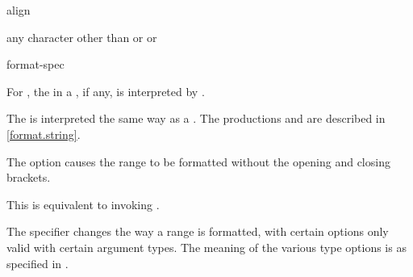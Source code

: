 \documentclass{wg21}
\begin{document}
\begin{ncbnf}
    \br
     align
\end{ncbnf}

\begin{ncbnf}
    \br
    \textnormal{any character other than} \terminal{\{} \textnormal{or} \terminal{\}} \textnormal{or} \terminal{:}
\end{ncbnf}

\begin{ncbnf}
    \br
    \br
    \br
\end{ncbnf}

\begin{ncbnf}
    \br
    \terminal{:} format-spec
\end{ncbnf}

\pnum
For ,
the 
in a , if any,
is interpreted by .

\pnum
The  is interpreted
the same way as a .
The productions  and 
are described in \ref{format.string}.

\pnum
The  option causes the range to be formatted
without the opening and closing brackets.
\begin{note}
    This is equivalent to invoking .
\end{note}

\pnum
The  specifier changes the way a range is formatted,
with certain options only valid with certain argument types.
The meaning of the various type options
is as specified in .
\end{document}
